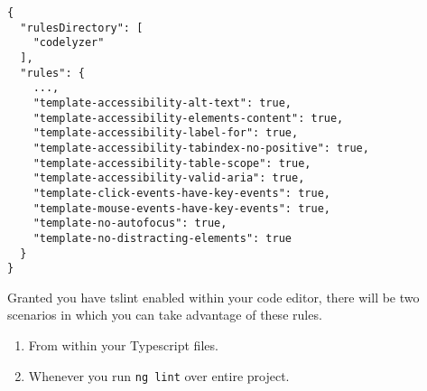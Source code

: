 \begin{lstlisting}
{
  "rulesDirectory": [
    "codelyzer"
  ],
  "rules": {
    ...,
    "template-accessibility-alt-text": true,
    "template-accessibility-elements-content": true,
    "template-accessibility-label-for": true,
    "template-accessibility-tabindex-no-positive": true,
    "template-accessibility-table-scope": true,
    "template-accessibility-valid-aria": true,
    "template-click-events-have-key-events": true,
    "template-mouse-events-have-key-events": true,
    "template-no-autofocus": true,
    "template-no-distracting-elements": true
  }
}  
\end{lstlisting}

Granted you have tslint enabled within your code editor, there will be two scenarios in which you can take advantage of these rules. 
\begin{enumerate}
  \item From within your Typescript files.
  \item Whenever you run \lstinline{ng lint} over entire project.
\end{enumerate}